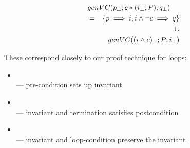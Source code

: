 \begin{eqnarray*}
  \lefteqn{genVC( \assrt p ; c * ( \assrt i ; P ) ; \assrt q ) }
\\&=& \setof{ p \implies i, i \land \lnot c \implies q }
\\ && \cup
\\&& genVC( \assrt{(i \land c)}; P ; \assrt i)
\end{eqnarray*}

These correspond closely to our proof technique for loops:
\begin{itemize}
  \item {}
   \\--- pre-condition sets up invariant
  \item {}
   \\--- invariant and termination satisfies postcondition
  \item {}
    \\--- invariant and loop-condition preserve the invariant
\end{itemize}
